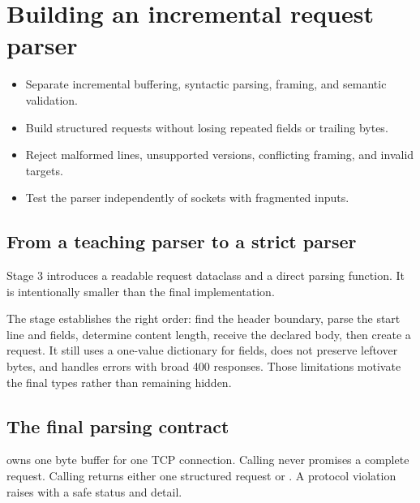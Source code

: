 \chapter{Building an incremental request parser}

\begin{objectives}
\begin{itemize}
  \item Separate incremental buffering, syntactic parsing, framing, and semantic validation.
  \item Build structured requests without losing repeated fields or trailing bytes.
  \item Reject malformed lines, unsupported versions, conflicting framing, and invalid targets.
  \item Test the parser independently of sockets with fragmented inputs.
\end{itemize}
\end{objectives}

\section{From a teaching parser to a strict parser}

Stage 3 introduces a readable request dataclass and a direct parsing function.
It is intentionally smaller than the final implementation.


The stage establishes the right order: find the header boundary, parse the start
line and fields, determine content length, receive the declared body, then create
a request. It still uses a one-value dictionary for fields, does not preserve
leftover bytes, and handles errors with broad 400 responses. Those limitations
motivate the final types rather than remaining hidden.

\section{The final parsing contract}

 owns one byte buffer for one TCP connection. Calling
 never promises a complete request. Calling 
returns either one structured request or . A protocol violation raises
 with a safe status and detail.

